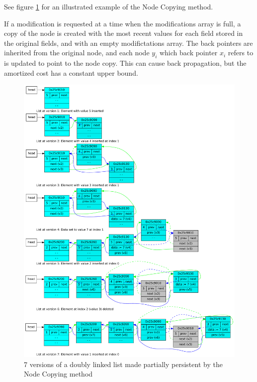See figure \ref{fig:pp-7-versions.pdf} for an illustrated example of the Node
Copying method.

If a modification is requested at a time when the modifications array is full, a
copy of the node is created with the most recent values for each field stored in
the original fields, and with an empty modifictations array. The back pointers
are inherited from the original node, and each node $y_i$ which back pointer
$x_i$ refers to is updated to point to the node copy. This can cause back
propagation, but the amortized cost has a constant upper bound.


\begin{figure}[!hbp]
    \includegraphics[width=\textwidth]{figures/pp-7-versions.pdf}
    \caption{7 versions of a doubly linked list made  partially persistent by 
    the Node Copying method}
    \label{fig:pp-7-versions.pdf}
\end{figure}